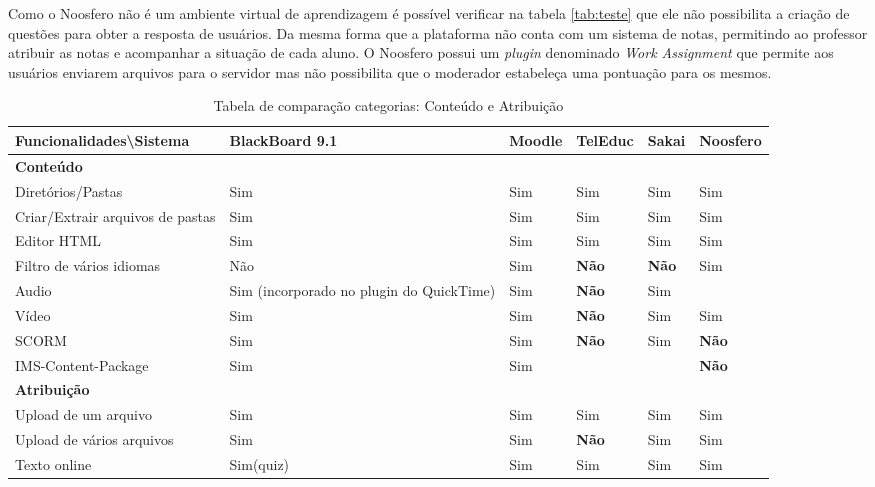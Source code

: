 Como o Noosfero não é um ambiente virtual de aprendizagem é possível verificar na tabela \ref{tab:teste} que ele não possibilita a criação de questões para obter a resposta de usuários. Da mesma forma que a plataforma não conta com um sistema de notas, permitindo ao professor atribuir as notas e acompanhar a situação de cada aluno. O Noosfero possui um \textit{plugin} denominado \textit{Work Assignment} que permite aos usuários enviarem arquivos para o servidor mas não possibilita que o moderador estabeleça uma pontuação para os mesmos.

\begin{landscape}
\begin{table}[H]
\begin{center}
\begin{tabular}{|@{}p{5.5cm}|p{3.5cm}|p{3.5cm}|p{3.5cm}|p{3.5cm}|p{3.5cm}@{}|}
\hline
\textbf{Funcionalidades\textbackslash Sistema} & \textbf{BlackBoard 9.1} & \textbf{Moodle} & \textbf{TelEduc} & \textbf{Sakai} & \textbf{Noosfero}\\ \hline
\textbf{Conteúdo} &  &  &  &  &  \\
Diretórios/Pastas & Sim & Sim & Sim & Sim & Sim \\
Criar/Extrair arquivos de pastas & Sim & Sim & Sim & Sim & Sim \\
Editor HTML & Sim & Sim & Sim & Sim & Sim \\
Filtro de vários idiomas & Não & Sim & \textbf{Não} & \textbf{Não} & Sim \\
Audio & Sim {\tiny (incorporado no plugin do QuickTime)} & Sim & \textbf{Não} & Sim &  \\
Vídeo & Sim & Sim & \textbf{Não} & Sim & Sim \\
SCORM & Sim & Sim & \textbf{Não} & Sim & \textbf{Não} \\
IMS-Content-Package & Sim & Sim &  &  & \textbf{Não} \\
\textbf{Atribuição} &  &  &  &  &  \\
Upload de um arquivo & Sim & Sim & Sim & Sim & Sim \\
Upload de vários arquivos & Sim & Sim & \textbf{Não} & Sim & Sim \\
Texto online & Sim(quiz) & Sim & Sim & Sim & Sim \\ \hline
\end{tabular}
\caption{Tabela de comparação categorias: Conteúdo e Atribuição}
\label{tab:conteudo-atribuicao}
\end{center}
\end{table}


\end{landscape}
